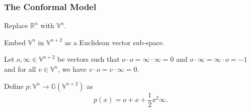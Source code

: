 \documentclass{beamer}
\newcommand{\G}{\mathbb{G}}
\newcommand{\V}{\mathbb{V}}
\newcommand{\R}{\mathbb{R}}
\newcommand{\nvao}{o}
\newcommand{\nvai}{\infty}
\begin{document}
\begin{frame}
\frametitle{The Conformal Model}
Replace $\R^n$ with $\V^n$.

Embed $\V^n$ in $\V^{n+2}$ as a Euclidean vector sub-space.

Let $\nvao,\nvai\in\V^{n+2}$ be vectors such that $\nvao\cdot\nvao=\nvai\cdot\nvai=0$
and $\nvao\cdot\nvai=\nvai\cdot\nvao=-1$ and for all $v\in\V^n$, we have $v\cdot\nvao=v\cdot\nvai=0$.

\begin{definition}
Define $p:\V^n\to\G(\V^{n+2})$ as
\begin{equation*}
p(x) = \nvao + x + \frac{1}{2}x^2\nvai.
\end{equation*}
\end{definition}
\end{frame}


\end{document}

